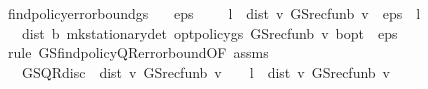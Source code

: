 \begin{isabellebody}
\endisatagproof
{\isafoldproof}%
%
\isadelimproof
\isanewline
%
\endisadelimproof
\isanewline
{}\isamarkupfalse%
\ find{\isacharunderscore}{\kern0pt}policy{\isacharunderscore}{\kern0pt}error{\isacharunderscore}{\kern0pt}bound{\isacharunderscore}{\kern0pt}gs{\isacharcolon}{\kern0pt}\isanewline
\ \ \ {\isachardoublequoteopen}eps\ {\isachargreater}{\kern0pt}\ {}{\isachardoublequoteclose}\ {\isachardoublequoteopen}{}\ {\isacharasterisk}{\kern0pt}\ l\ {\isacharasterisk}{\kern0pt}\ dist\ v\ {\isacharparenleft}{\kern0pt}GS{\isacharunderscore}{\kern0pt}rec{\isacharunderscore}{\kern0pt}fun\isactrlsub b\ v{\isacharparenright}{\kern0pt}\ {\isacharless}{\kern0pt}\ eps\ {\isacharasterisk}{\kern0pt}\ {\isacharparenleft}{\kern0pt}{}{\isacharminus}{\kern0pt}l{\isacharparenright}{\kern0pt}{\isachardoublequoteclose}\isanewline
\ \ \ {\isachardoublequoteopen}dist\ {\isacharparenleft}{\kern0pt}{\isasymnu}\isactrlsub b\ {\isacharparenleft}{\kern0pt}mk{\isacharunderscore}{\kern0pt}stationary{\isacharunderscore}{\kern0pt}det\ {\isacharparenleft}{\kern0pt}opt{\isacharunderscore}{\kern0pt}policy{\isacharunderscore}{\kern0pt}gs\ {\isacharparenleft}{\kern0pt}GS{\isacharunderscore}{\kern0pt}rec{\isacharunderscore}{\kern0pt}fun\isactrlsub b\ v{\isacharparenright}{\kern0pt}{\isacharparenright}{\kern0pt}{\isacharparenright}{\kern0pt}{\isacharparenright}{\kern0pt}\ {\isasymnu}\isactrlsub b{\isacharunderscore}{\kern0pt}opt\ {\isacharless}{\kern0pt}\ eps{\isachardoublequoteclose}\isanewline
%
\isadelimproof
%
\endisadelimproof
%
\isatagproof
{}\isamarkupfalse%
\ {\isacharparenleft}{\kern0pt}rule\ GS{\isachardot}{\kern0pt}find{\isacharunderscore}{\kern0pt}policy{\isacharunderscore}{\kern0pt}QR{\isacharunderscore}{\kern0pt}error{\isacharunderscore}{\kern0pt}bound{\isacharbrackleft}{\kern0pt}OF\ assms{\isacharparenleft}{\kern0pt}{}{\isacharparenright}{\kern0pt}{\isacharbrackright}{\kern0pt}{\isacharparenright}{\kern0pt}\isanewline
\ \ \isamarkupfalse%
\ {\isachardoublequoteopen}{}\ {\isacharasterisk}{\kern0pt}\ GS{\isachardot}{\kern0pt}QR{\isacharunderscore}{\kern0pt}disc\ {\isacharasterisk}{\kern0pt}\ dist\ v\ {\isacharparenleft}{\kern0pt}GS{\isacharunderscore}{\kern0pt}rec{\isacharunderscore}{\kern0pt}fun\isactrlsub b\ v{\isacharparenright}{\kern0pt}\ {\isasymle}\ {}\ {\isacharasterisk}{\kern0pt}\ l\ {\isacharasterisk}{\kern0pt}\ dist\ v\ {\isacharparenleft}{\kern0pt}GS{\isacharunderscore}{\kern0pt}rec{\isacharunderscore}{\kern0pt}fun\isactrlsub b\ v{\isacharparenright}{\kern0pt}{\isachardoublequoteclose}\isanewline

\end{isabellebody}
